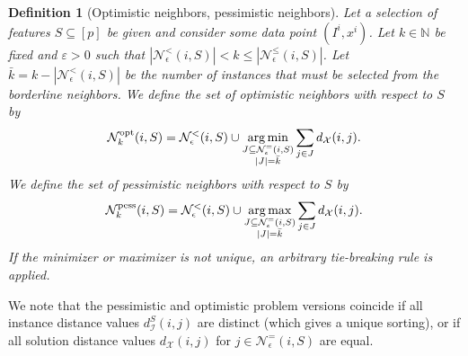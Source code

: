 \documentclass[11pt, a4paper]{article}
\newtheorem{definition}{Definition}
\newcommand{\X}{{\mathcal{X}}} %
\newcommand{\instanceindex}{i}
\newcommand{\fsel}{S} %
\newcommand{\selectionset}{\fsel}
\newcommand{\neighbour}{\ensuremath{\mathcal{N}}}
\newcommand{\sEpsStrict}[1][(\instanceindex,\selectionset)]{\ensuremath{\neighbour^<_\epsilon#1}}
\newcommand{\sEpsBorder}[1][(\instanceindex,\selectionset)]{\ensuremath{\neighbour^=_\epsilon#1}}
\newcommand{\sEpsNeighbour}[1][(\instanceindex,\selectionset)]{\ensuremath{\neighbour^\le_\epsilon#1}}
\newcommand{\skOpt}[1][(\instanceindex,\selectionset)]{\neighbour_k^\textnormal{opt}#1}
\newcommand{\skPess}[1][(\instanceindex,\selectionset)]{\neighbour_k^\textnormal{pess}#1}
\DeclareMathOperator*{\argmax}{arg\,max}
\DeclareMathOperator*{\argmin}{arg\,min}
\begin{document}
\begin{definition}[Optimistic neighbors, pessimistic neighbors\label{def:neighbors}]
Let a selection of features $\selectionset\subseteq[p]$ be given and consider some data point $(I^i, x^i)$. Let $k \in \mathbb{N}$ be fixed and $\varepsilon > 0$ such that $|\sEpsStrict| < k \leq |\sEpsNeighbour|$. Let $\bar{k}=k-|\sEpsStrict|$ be the number of instances that must be selected from the borderline neighbors.
We define the set of \emph{optimistic neighbors} with respect to $\selectionset$ by
\[ \skOpt = \sEpsStrict \cup \argmin_{\substack{J \subseteq \sEpsBorder \\ |J| = \bar{k}}} \sum_{j\in J} d_\X(i,j). \]
We define the set of \emph{pessimistic neighbors} with respect to $\selectionset$ by
\[ \skPess = \sEpsStrict \cup \argmax_{\substack{J \subseteq \sEpsBorder \\ |J| = \bar{k}}}  \sum_{j\in J} d_\X(i,j). \]
If the minimizer or maximizer is not unique, an arbitrary tie-breaking rule is applied.
\end{definition}

We note that the pessimistic and optimistic problem versions coincide if all instance distance values $d_{\mathcal{I}}^{\selectionset}(i,j)$ are distinct (which gives a unique sorting), or if all solution distance values $d_\X(i,j)$ for $j \in \sEpsBorder$ are equal. 
\end{document}
